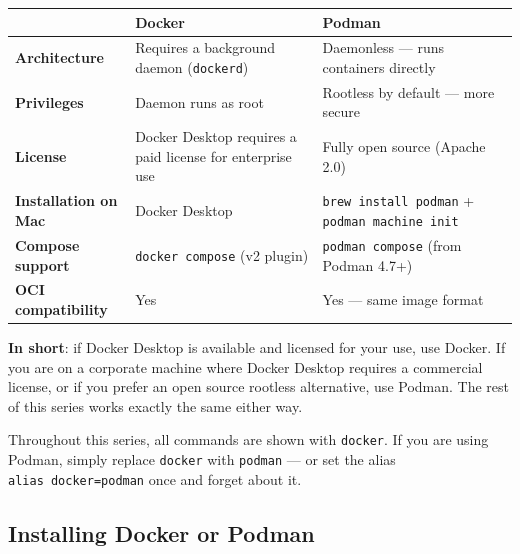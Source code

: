 \documentclass[11pt,american,a4paper,openany]{book}
\renewenvironment{quote}{\begin{quoteblock}}{\end{quoteblock}}
\begin{document}
\begin{longtable}[]{@{}
  >{\raggedright\arraybackslash}p{}
  >{\raggedright\arraybackslash}p{}
  >{\raggedright\arraybackslash}p{}@{}}
\toprule\noalign{}
\begin{minipage}[b]{\linewidth}\raggedright
\end{minipage} & \begin{minipage}[b]{\linewidth}\raggedright
Docker
\end{minipage} & \begin{minipage}[b]{\linewidth}\raggedright
Podman
\end{minipage} \\
\midrule\noalign{}
\endhead
\bottomrule\noalign{}
\endlastfoot
\textbf{Architecture} & Requires a background daemon (\texttt{dockerd})
& Daemonless --- runs containers directly \\
\textbf{Privileges} & Daemon runs as root & Rootless by default --- more
secure \\
\textbf{License} & Docker Desktop requires a paid license for enterprise
use & Fully open source (Apache 2.0) \\
\textbf{Installation on Mac} & Docker Desktop &
\texttt{brew\ install\ podman} + \texttt{podman\ machine\ init} \\
\textbf{Compose support} & \texttt{docker\ compose} (v2 plugin) &
\texttt{podman\ compose} (from Podman 4.7+) \\
\textbf{OCI compatibility} & Yes & Yes --- same image format \\
\end{longtable}

\textbf{In short}: if Docker Desktop is available and licensed for your
use, use Docker. If you are on a corporate machine where Docker Desktop
requires a commercial license, or if you prefer an open source rootless
alternative, use Podman. The rest of this series works exactly the same
either way.

\begin{quote}
Throughout this series, all commands are shown with \texttt{docker}. If
you are using Podman, simply replace \texttt{docker} with
\texttt{podman} --- or set the alias \texttt{alias\ docker=podman} once
and forget about it.
\end{quote}

\subsection{Installing Docker or
Podman}\label{installing-docker-or-podman}
\end{document}

